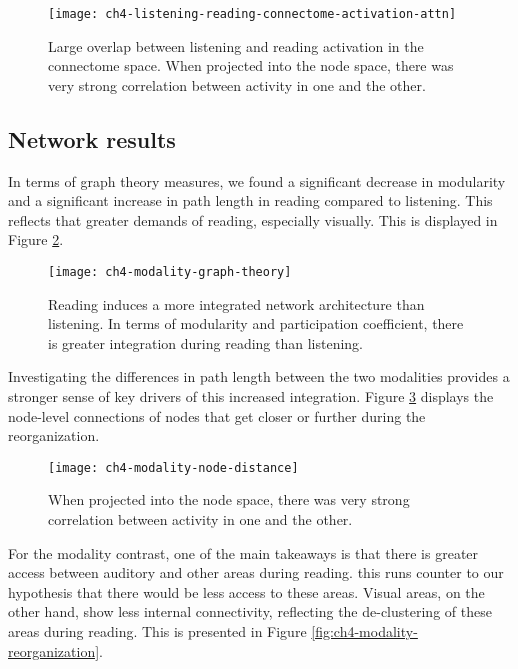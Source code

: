 \begin{figure}[t]
	\centering
	\texttt{[image: ch4-listening-reading-connectome-activation-attn]}
    \caption[Large overlap between listening and reading activation in the connectome space.]{Large overlap between listening and reading activation in the connectome space. When projected into the node space, there was very strong correlation between activity in one and the other.}
	\label{fig:ch4-listening-reading-connectome-activation-attn}
\end{figure}

\subsection{Network results}

In terms of graph theory measures, we found a significant decrease in modularity and a significant increase in path length in reading compared to listening. This reflects that greater demands of reading, especially visually. This is displayed in Figure \ref{fig:ch4-modality-graph-theory}.

\begin{figure}[t]
	\centering
	\texttt{[image: ch4-modality-graph-theory]}
    \caption[Reading induces a more integrated network architecture than listening.]{Reading induces a more integrated network architecture than listening. In terms of modularity and participation coefficient, there is greater integration during reading than listening. }
	\label{fig:ch4-modality-graph-theory}
\end{figure}

Investigating the differences in path length between the two modalities provides a stronger sense of key drivers of this increased integration. Figure \ref{fig:ch4-modality-node-distance} displays the node-level connections of nodes that get closer or further during the reorganization.

\begin{figure}[t]
	\centering
	\texttt{[image: ch4-modality-node-distance]}
    \caption[Large overlap between listening and reading activation in the connectome space.]{When projected into the node space, there was very strong correlation between activity in one and the other.}
	\label{fig:ch4-modality-node-distance}
\end{figure}

For the modality contrast, one of the main takeaways is that there is greater access between auditory and other areas during reading. this runs counter to our hypothesis that there would be less access to these areas. Visual areas, on the other hand, show less internal connectivity, reflecting the de-clustering of these areas during reading. This is presented in Figure \ref{fig:ch4-modality-reorganization}.

